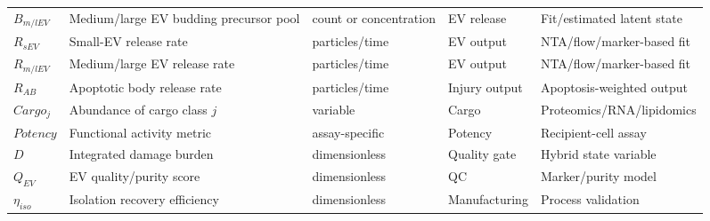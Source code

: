 \begin{table}[t]
\begin{tabular}{p{2.5cm} p{5.0cm} p{2.1cm} p{2.7cm} p{3.2cm}}
$B_{m/lEV}$ & Medium/large EV budding precursor pool & count or concentration & EV release & Fit/estimated latent state \\
$R_{sEV}$ & Small-EV release rate & particles/time & EV output & NTA/flow/marker-based fit \\
$R_{m/lEV}$ & Medium/large EV release rate & particles/time & EV output & NTA/flow/marker-based fit \\
$R_{AB}$ & Apoptotic body release rate & particles/time & Injury output & Apoptosis-weighted output \\
$Cargo_j$ & Abundance of cargo class $j$ & variable & Cargo & Proteomics/RNA/lipidomics \\
$Potency$ & Functional activity metric & assay-specific & Potency & Recipient-cell assay \\
$D$ & Integrated damage burden & dimensionless & Quality gate & Hybrid state variable \\
$Q_{EV}$ & EV quality/purity score & dimensionless & QC & Marker/purity model \\
$\eta_{iso}$ & Isolation recovery efficiency & dimensionless & Manufacturing & Process validation \\
\bottomrule
\end{tabular}
\end{table}

